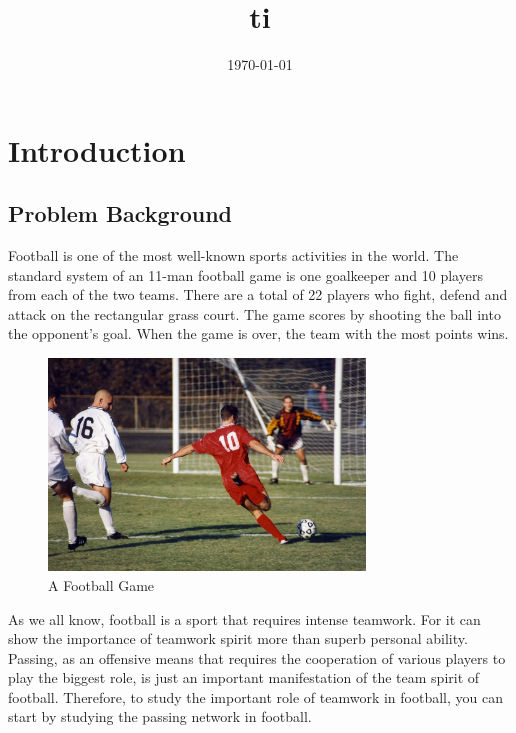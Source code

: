 \documentclass{mcmthesis}
\begin{document}
\linespread{0.6} %
\setlength{\parskip}{0.5\baselineskip} %
\title{ti}

\date{\today}
	\begin{abstract}

	
		\begin{keywords}
		
		\end{keywords}
	\end{abstract}

\maketitle

\tableofcontents

\newpage

\section{Introduction}
\subsection{Problem Background}
	Football is one of the most well-known sports activities in the world.  The standard system of an 11-man football game is one goalkeeper and 10 players from each of the two teams. There are a total of 22 players who fight, defend and attack on the rectangular grass court.  The game scores by shooting the ball into the opponent's goal. When the game is over, the team with the most points wins.

	\begin{figure}[h]
		\centering
		\includegraphics[width=0.75\textwidth]{figures/football.jpg}
		\caption{A Football Game~\cite{Wiki_Football}}
	\end{figure}

	As we all know, football is a sport that requires intense teamwork.  For it can show the importance of teamwork spirit more than superb personal ability.  Passing, as an offensive means that requires the cooperation of various players to play the biggest role, is just an important manifestation of the team spirit of football.  Therefore, to study the important role of teamwork in football, you can start by studying the passing network in football.
\end{document}
